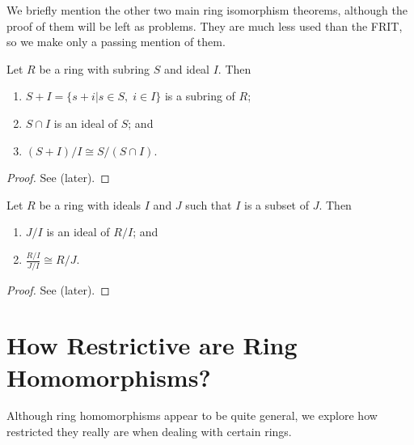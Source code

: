 We briefly mention the other two main ring isomorphism theorems, although the proof of them will be left as problems. They are much less used than the FRIT, so we make only a passing mention of them.
\begin{theorem}\label{thrm-ring-isomorphism-2}
    Let $R$ be a ring with subring $S$ and ideal $I$. Then
    \begin{enumerate}
        \item $S+I = \{s+i \vert s\in S,\;i\in I\}$ is a subring of $R$;
        \item $S \cap I$ is an ideal of $S$; and
        \item $(S+I)/I \cong S/(S\cap I)$.
    \end{enumerate}
\end{theorem}
\begin{proof}
    See  (later).
\end{proof}

\begin{theorem}\label{thrm-ring-isomorphism-3}
    Let $R$ be a ring with ideals $I$ and $J$ such that $I$ is a subset of $J$. Then
    \begin{enumerate}
        \item $J/I$ is an ideal of $R/I$; and
        \item $\frac{R/I}{J/I} \cong R/J$.
    \end{enumerate}
\end{theorem}
\begin{proof}
    See  (later).
\end{proof}

\section{How Restrictive are Ring Homomorphisms?}
Although ring homomorphisms appear to be quite general, we explore how restricted they really are when dealing with certain rings.

